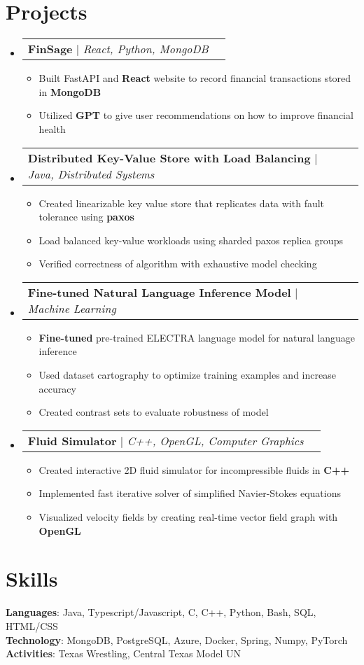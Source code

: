 \documentclass[letterpaper,11pt]{article}
\makeatletter
\newcommand{\resumeItem}[1]{
  \item\small{
    {#1 \vspace{-2pt}}
  }
}
\newcommand{\resumeProjectHeading}[2]{
    \item
    \begin{tabular*}{0.97\textwidth}{l@{\extracolsep{\fill}}r}
      \small#1 & #2 \\
    \end{tabular*}\vspace{-7pt}
}
\newcommand{\resumeSubHeadingListStart}{\begin{itemize}[leftmargin=0.15in, label={}]}
\newcommand{\resumeSubHeadingListEnd}{\end{itemize}}
\newcommand{\resumeItemListStart}{\begin{itemize}}
\newcommand{\resumeItemListEnd}{\end{itemize}\vspace{-5pt}}
\makeatother
\begin{document}
\section{Projects}
    \resumeSubHeadingListStart
      \resumeProjectHeading
          {\textbf{FinSage} $|$ \emph{React, Python, MongoDB}}{} %
          \resumeItemListStart
            \resumeItem{Built FastAPI and \textbf{React} website to record financial transactions stored in \textbf{MongoDB}}
            \resumeItem{Utilized \textbf{GPT} to give user recommendations on how to improve financial health}
          \resumeItemListEnd
      \resumeProjectHeading
          {\textbf{Distributed Key-Value Store with Load Balancing} $|$ \emph{Java, Distributed Systems}}{}
          \resumeItemListStart
            \resumeItem{Created linearizable key value store that replicates data with fault tolerance using \textbf{paxos}}
            \resumeItem{Load balanced key-value workloads using sharded paxos replica groups}
            \resumeItem{Verified correctness of algorithm with exhaustive model checking}
          \resumeItemListEnd
      \resumeProjectHeading
          {\textbf{Fine-tuned Natural Language Inference Model} $|$ \emph{Machine Learning}}{}
          \resumeItemListStart
            \resumeItem{\textbf{Fine-tuned} pre-trained ELECTRA language model for natural language inference}
            \resumeItem{Used dataset cartography to optimize training examples and increase accuracy}
            \resumeItem{Created contrast sets to evaluate robustness of model}
          \resumeItemListEnd
      \resumeProjectHeading
          {\textbf{Fluid Simulator} $|$ \emph{C++, OpenGL, Computer Graphics}}{} %
          \resumeItemListStart
            \resumeItem{Created interactive 2D fluid simulator for incompressible fluids in \textbf{C++}}
            \resumeItem{Implemented fast iterative solver of simplified Navier-Stokes equations}
            \resumeItem{Visualized velocity fields by creating real-time vector field graph with \textbf{OpenGL}}
          \resumeItemListEnd
    \resumeSubHeadingListEnd

%
\section{Skills}
 \begin{itemize}[leftmargin=0.15in, label={}]
    \small{\item{
     \textbf{Languages}{: Java, Typescript/Javascript, C, C++, Python, Bash, SQL, HTML/CSS} \\
     \textbf{Technology}{: MongoDB, PostgreSQL, Azure, Docker, Spring, Numpy, PyTorch} \\
     \textbf{Activities}{: Texas Wrestling, Central Texas Model UN} \\
    }}
 \end{itemize}
\end{document}
